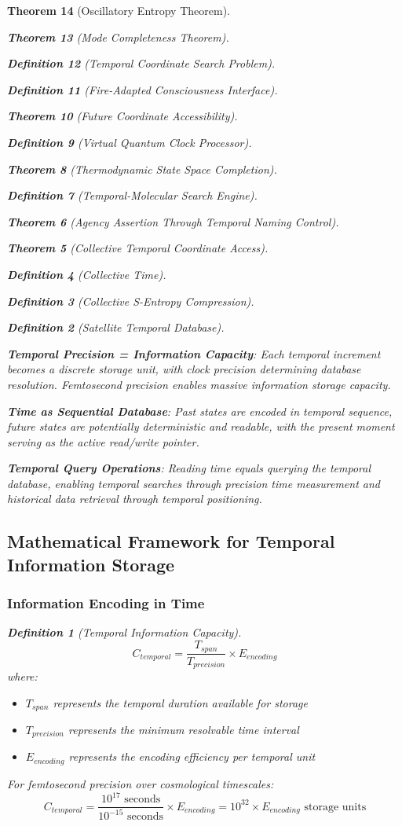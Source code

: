 \documentclass[12pt,a4paper]{article}
\newtheorem{theorem}{Theorem}[section]
\newtheorem{definition}[theorem]{Definition}
\begin{document}
\begin{theorem}[Oscillatory Entropy Theorem]
\begin{theorem}[Mode Completeness Theorem]
\begin{enumerate}
\begin{definition}[Temporal Coordinate Search Problem]
\begin{algorithm}
\begin{definition}[Fire-Adapted Consciousness Interface]
\begin{theorem}[Future Coordinate Accessibility]
\begin{definition}[Virtual Quantum Clock Processor]
\begin{itemize}
\begin{itemize}
\begin{theorem}[Thermodynamic State Space Completion]
\begin{definition}[Temporal-Molecular Search Engine]
\begin{theorem}[Agency Assertion Through Temporal Naming Control]
\begin{remark}
\begin{theorem}[Collective Temporal Coordinate Access]
\begin{definition}[Collective Time]
\begin{definition}[Collective S-Entropy Compression]
\begin{definition}[Satellite Temporal Database]
\begin{algorithm}
\begin{table}[h]
{{\textbf{Temporal Precision = Information Capacity}:
Each temporal increment becomes a discrete storage unit, with clock precision determining database resolution. Femtosecond precision enables massive information storage capacity.

\textbf{Time as Sequential Database}:
Past states are encoded in temporal sequence, future states are potentially deterministic and readable, with the present moment serving as the active read/write pointer.

\textbf{Temporal Query Operations}:
Reading time equals querying the temporal database, enabling temporal searches through precision time measurement and historical data retrieval through temporal positioning.

\subsection{Mathematical Framework for Temporal Information Storage}

\subsubsection{Information Encoding in Time}

\begin{definition}[Temporal Information Capacity]
$$C_{temporal} = \frac{T_{span}}{T_{precision}} \times E_{encoding}$$
where:
\begin{itemize}
\item $T_{span}$ represents the temporal duration available for storage
\item $T_{precision}$ represents the minimum resolvable time interval
\item $E_{encoding}$ represents the encoding efficiency per temporal unit
\end{itemize}
\end{definition}

For femtosecond precision over cosmological timescales:
$$C_{temporal} = \frac{10^{17} \text{ seconds}}{10^{-15} \text{ seconds}} \times E_{encoding} = 10^{32} \times E_{encoding} \text{ storage units}$$

}}
\end{table}
\end{algorithm}
\end{definition}
\end{definition}
\end{definition}
\end{theorem}
\end{remark}
\end{theorem}
\end{definition}
\end{theorem}
\end{itemize}
\end{itemize}
\end{definition}
\end{theorem}
\end{definition}
\end{algorithm}
\end{definition}
\end{enumerate}
\end{theorem}
\end{theorem}
\end{document}
